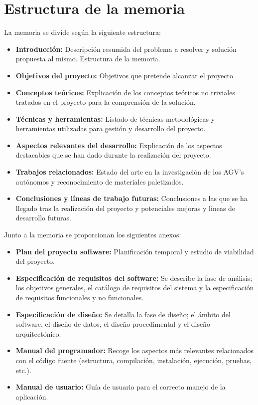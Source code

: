 \section{Estructura de la memoria}
La memoria se divide según la siguiente estructura:
\begin{itemize}
\tightlist
\item
  \textbf{Introducción:} Descripción  resumida del problema a resolver y solución propuesta al mismo. 
Estructura de la memoria.
\item
  \textbf{Objetivos del proyecto:} Objetivos que pretende alcanzar el proyecto
\item
  \textbf{Conceptos teóricos:} Explicación de los conceptos teóricos no triviales tratados en el proyecto para la comprensión de la solución.
\item
  \textbf{Técnicas y herramientas:} Listado de técnicas metodológicas y
  herramientas utilizadas para gestión y desarrollo del proyecto.
\item
  \textbf{Aspectos relevantes del desarrollo:} Explicación de los aspectos
  destacables que se han dado durante la realización del proyecto.
\item
  \textbf{Trabajos relacionados:} Estado del arte en la investigación de los AGV's autónomos y reconocimiento de materiales paletizados.
\item
  \textbf{Conclusiones y líneas de trabajo futuras:} Conclusiones
  a las que se ha llegado tras la realización del proyecto y potenciales mejoras y lineas de desarrollo futuras.
\end{itemize}
\newpage
Junto a la memoria se proporcionan los siguientes anexos:

\begin{itemize}
\tightlist
\item
  \textbf{Plan del proyecto software:} Planificación temporal y estudio
  de viabilidad del proyecto.
\item
  \textbf{Especificación de requisitos del software:} Se describe la
  fase de análisis; los objetivos generales, el catálogo de requisitos
  del sistema y la especificación de requisitos funcionales y no
  funcionales.
\item
  \textbf{Especificación de diseño:} Se detalla la fase de diseño; el
  ámbito del software, el diseño de datos, el diseño procedimental y el
  diseño arquitectónico.
\item
  \textbf{Manual del programador:} Recoge los aspectos más relevantes
  relacionados con el código fuente (estructura, compilación,
  instalación, ejecución, pruebas, etc.).
\item
  \textbf{Manual de usuario:} Guía de usuario para el correcto manejo de
  la aplicación.
\end{itemize}
